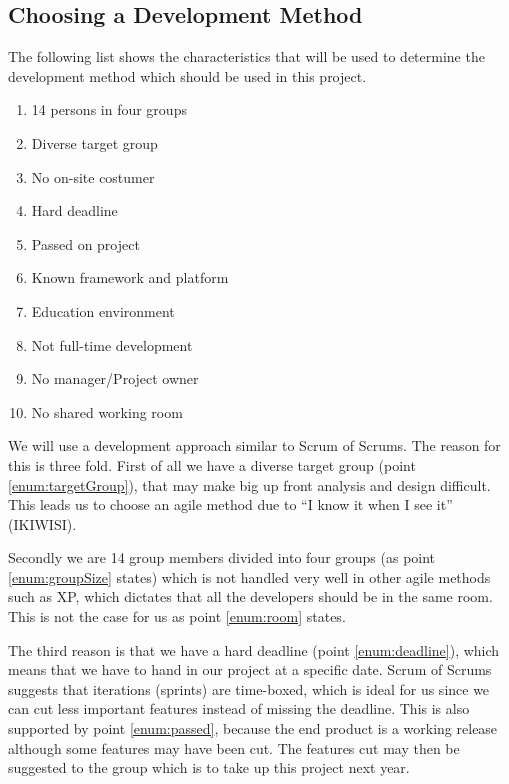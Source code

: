 \subsection{Choosing a Development Method}
The following list shows the characteristics that will be used to determine the development method which should be used in this project.
\begin{enumerate}
	\item 14 persons in four groups \label{enum:groupSize}
	\item Diverse target group \label{enum:targetGroup}
	\item No on-site costumer \label{enum:onsite}
	\item Hard deadline \label{enum:deadline}
	\item Passed on project \label{enum:passed}
	\item Known framework and platform \label{enum:framework}
	\item Education environment \label{enum:education}
	\item Not full-time development \label{enum:halftime}
	\item No manager/Project owner \label{enum:manager}
	\item No shared working room \label{enum:room}
\end{enumerate}
We will use a development approach similar to Scrum of Scrums.
The reason for this is three fold.
First of all we have a diverse target group (point \ref{enum:targetGroup}), that may make big up front analysis and design difficult.
This leads us to choose an agile method due to ``I know it when I see it'' (IKIWISI).

Secondly we are 14 group members divided into four groups (as point \ref{enum:groupSize} states) which is not handled very well in other agile methods such as XP, which dictates that all the developers should be in the same room. 
This is not the case for us as point \ref{enum:room} states.

The third reason is that we have a hard deadline (point \ref{enum:deadline}), which means that we have to hand in our project at a specific date.
Scrum of Scrums suggests that iterations (sprints) are time-boxed, which is ideal for us since we can cut less important features instead of missing the deadline.
This is also supported by point \ref{enum:passed}, because the end product is a working release although some features may have been cut.
The features cut may then be suggested to the group which is to take up this project next year.


